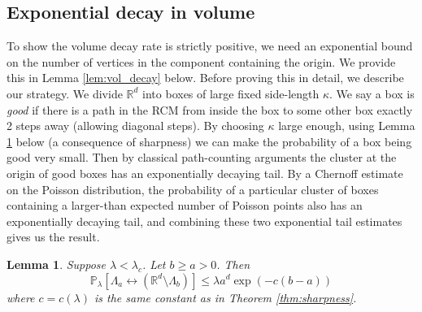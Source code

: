 \documentclass[a4paper,12pt]{scrartcl}
\renewcommand{\P}{\mathbb{P}}
\newtheorem{lemma}[theorem]{Lemma}
\theoremstyle{definition}
\theoremstyle{remark}
\begin{document}
  \subsection{Exponential decay in volume}
  \label{ss:expvol}
  To show the volume decay rate is strictly positive,
  we need an exponential bound on the number of vertices in the component containing the origin. We provide this in Lemma \ref{lem:vol_decay} below.
  Before proving this in detail,  we describe our strategy. We divide
  $\mathbb R^d$ into boxes of large fixed side-length $\kappa$. We say a box
  is {\em good} if there is a path in the RCM from inside the box to
  some other box exactly 2 steps away (allowing diagonal steps).
  By choosing $\kappa$ large enough, using Lemma
  \ref{lem:boxboxcrossing} below (a consequence of sharpness) we can make the probability of a box being good very small. Then by classical path-counting arguments the  cluster at the origin  of good boxes has an exponentially decaying tail.
  By a Chernoff estimate on the Poisson distribution, the probability of a  particular cluster of boxes containing
  a larger-than expected number of Poisson points
  also has an exponentially decaying tail, and combining these two exponential tail estimates gives us the result.


  \begin{lemma} \label{lem:boxboxcrossing}
    Suppose $\lambda<\lambda_c$. Let $b\geq a > 0$. Then
    \begin{equation} \label{e:annulus}
      \P_{\lambda}[\Lambda_a\leftrightarrow (\mathbb
        R^d \setminus \Lambda_b)
      ]
      \leq
      \lambda a^d \exp(-c (b-a))
    \end{equation}
    where $c=c(\lambda)$ is the same constant as in
    Theorem \ref{thm:sharpness}.
  \end{lemma}
\end{document}
